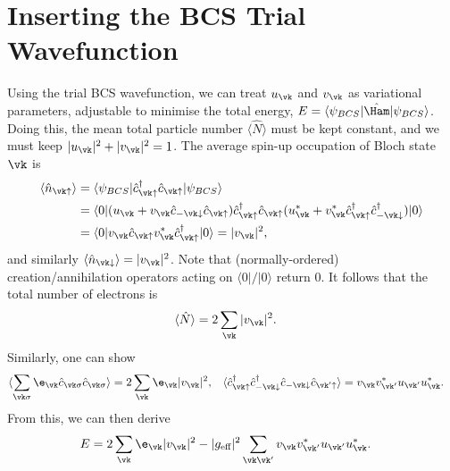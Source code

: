 \documentclass[a4paper, 11pt, normalem]{report}
\begin{document}
\section{Inserting the BCS Trial Wavefunction}
Using the trial BCS wavefunction, we can treat $u_{\vk}$ and $v_{\vk}$ as variational parameters, adjustable to minimise the total energy, $E=\langle\psi_{BCS}|\hat{\Ham}|\psi_{BCS}\rangle$.
Doing this, the mean total particle number $\langle\hat{N}\rangle$ must be kept constant, and we must keep $|u_{\vk}|^2+|v_{\vk}|^2=1$.
The average spin-up occupation of Bloch state $\vk$ is
\begin{align}
    \begin{split}
        \langle\hat{n}_{\vk\uparrow}\rangle &= \langle\psi_{BCS}|\hat{c}_{\vk\uparrow}^\dagger\hat{c}_{\vk\uparrow}|\psi_{BCS}\rangle \\
                                            &= \langle0|(u_{\vk}+v_{\vk}\hat{c}_{-\vk\downarrow}\hat{c}_{\vk\uparrow})\hat{c}_{\vk\uparrow}^\dagger\hat{c}_{\vk\uparrow}(u_{\vk}^*+v_{\vk}^*\hat{c}_{\vk\uparrow}^\dagger\hat{c}_{-\vk\downarrow}^\dagger)|0\rangle \\
                                            &= \langle0|v_{\vk}\hat{c}_{\vk\uparrow}v_{\vk}^*\hat{c}_{\vk\uparrow}^\dagger|0\rangle = |v_{\vk}|^2,
    \end{split}
\end{align}
and similarly $\langle\hat{n}_{\vk\downarrow}\rangle=|v_{\vk}|^2$.
Note that (normally-ordered) creation/annihilation operators acting on $\langle0|/|0\rangle$ return $0$.
It follows that the total number of electrons is
\begin{align}
    \langle\hat{N}\rangle &= 2\sum_{\vk}|v_{\vk}|^2.
\end{align}
Similarly, one can show
\begin{align}
    \langle\sum_{\vk\sigma}\e_{\vk}\hat{c}_{\vk\sigma}\hat{c}_{\vk\sigma}\rangle &= 2\sum_{\vk}\e_{\vk}|v_{\vk}|^2, & \langle\hat{c}_{\vk\uparrow}^\dagger\hat{c}_{-\vk\downarrow}^\dagger\hat{c}_{-\vk\downarrow}\hat{c}_{\vk'\uparrow}\rangle &= v_{\vk}v_{\vk'}^*u_{\vk'}u_{\vk}^*.
\end{align}
From this, we can then derive
\begin{align}
    E &= 2\sum_{\vk} \e_{\vk}|v_{\vk}|^2 - |g_{\text{eff}}|^2\sum_{\vk\vk'}v_{\vk}v_{\vk'}^*u_{\vk'}u_{\vk}^*.
\end{align}
\end{document}
